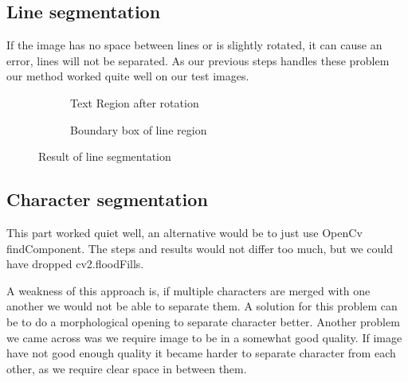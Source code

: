 \documentclass[Report.tex]{subfiles}
\begin{document}
\subsection{Line segmentation}
If the image has no space between lines or is slightly rotated, it can cause an error, lines will not be separated. As our previous steps handles these problem our method worked quite well on our test images.
\begin{figure}[ht]
  \centering
  \begin{subfigure}[t]{6cm}
    \caption{Text Region after rotation}
  \end{subfigure}
  \hspace{2cm}%
  \begin{subfigure}[t]{6cm}
    \caption{Boundary box of line region}
  \end{subfigure}

  \caption{Result of line segmentation}
  \label{fig:result:rotation}
\end{figure}

\subsection{Character segmentation}
\begin{flushleft}
This part worked quiet well, an alternative would be to just use OpenCv findComponent. The steps and results would not differ too much, but we could have dropped cv2.floodFills. \par
A weakness of this approach is, if multiple characters are merged with one another we would not be able to separate them. A solution for this problem can be to do a morphological opening to separate character better. Another problem we came across was we require image to be in a somewhat good quality. If image have not good enough quality it became harder to separate character from each other, as we require clear space in between them.
\end{flushleft}
\end{document}
